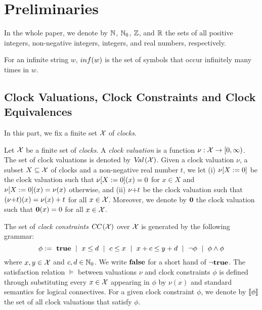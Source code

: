 \vspace{-0.8em}
\section{Preliminaries}
\vspace{-0.8em}

In the whole paper, we denote by $\mathbb{N}$, $\mathbb{N}_0$, $\mathbb{Z}$, and $\mathbb{R}$ the sets of all positive
integers, non-negative integers, integers, and real numbers, respectively.

For an infinite string $w$, $inf ( w )$ is the set of symbols that occur infinitely many times in $w$.
\vspace{-0.8em}
\subsection{Clock Valuations, Clock Constraints and Clock Equivalences}
\vspace{-0.8em}

In this part, we fix a finite set $\mathcal{X}$ of \emph{clocks}.

 Let $\mathcal{X}$ be a finite set of \emph{clocks}.
A \emph{clock valuation} is a function $\nu:\mathcal{X}\rightarrow [0,\infty)$. The set of clock valuations
is denoted by $\mbox{\sl Val}\left(\mathcal{X}\right)$.
Given a clock valuation $\nu$, a subset $X\subseteq\mathcal{X}$ of clocks and a non-negative real number $t$, we let (i) ${\nu}{\left[X:=0\right]}$ be the clock valuation such that ${\nu}{\left[X:=0\right]}(x)=0$ for $x\in X$ and ${\nu}{\left[X:=0\right]}(x)=\nu(x)$ otherwise, and (ii) ${\nu}{+}{t}$ be the clock valuation such that $({\nu}{+}{t})(x)=\nu(x)+t$ for all $x\in\mathcal{X}$.
Moreover, we denote by $\mathbf{0}$ the clock valuation such that $\mathbf{0}(x)=0$ for all $x\in\mathcal{X}$.

 The set of \emph{clock constraints} $\mbox{\sl CC}\left(\mathcal{X}\right)$ over $\mathcal{X}$ is generated by the following grammar:
\[
\phi:=~\mathbf{true}~\mid~x\le d~\mid ~c\le x~\mid~x+c\le y+d~\mid ~\neg\phi~\mid~\phi\wedge\phi
\]
where $x,y\in\mathcal{X}$ and $c,d\in\mathbb{N}_0$.
We write $\mathbf{false}$ for a short hand of $\neg\mathbf{true}$.
The satisfaction relation $\models$ between valuations $\nu$ and clock constraints $\phi$ is defined through substituting every $x\in\mathcal{X}$ appearing in $\phi$ by $\nu(x)$ and standard semantics for logical connectives.
For a given clock constraint $\phi$, we denote by ${\llbracket}{\phi}{\rrbracket}$ the set of all clock valuations that satisfy $\phi$.

